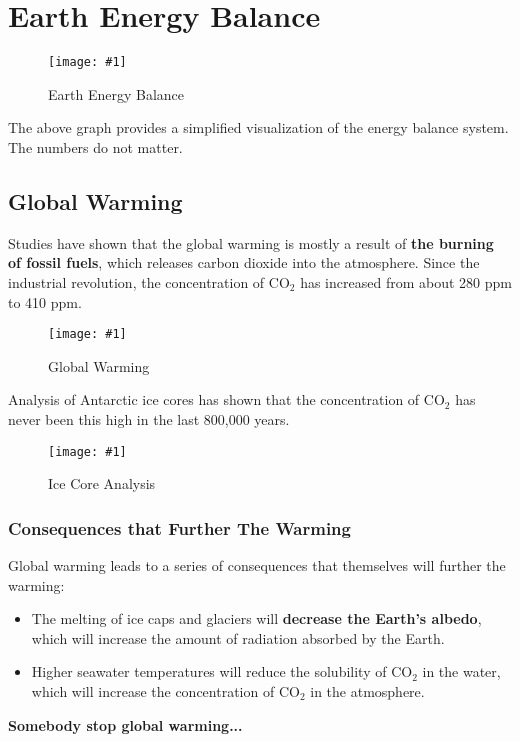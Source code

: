 \documentclass[a4paper,12pt]{article}
\let\oldsection\section
\renewcommand\section{\clearpage\oldsection}
\newcommand{\img}[4]{\begin{center}
  \begin{figure}[H]
    \centering
    \texttt{[image: \#1]}
    \caption{#3}
    \label{fig:#4}
  \end{figure}
\end{center}}
\begin{document}
\section{Earth Energy Balance}

\img{systemsummary.png}{1}{Earth Energy Balance}{systemsummary}

The above graph provides a simplified visualization of the energy balance system. The numbers do not matter.

\pagebreak

\subsection{Global Warming}

Studies have shown that the global warming is mostly a result of \textbf{the burning of fossil fuels}, which releases carbon dioxide into the atmosphere. Since the industrial revolution, the concentration of CO$_2$ has increased from about 280 ppm to 410 ppm.

\img{env.png}{0.8}{Global Warming}{env}

Analysis of Antarctic ice cores has shown that the concentration of CO$_2$ has never been this high in the last 800,000 years.

\img{icecore.png}{0.8}{Ice Core Analysis}{icecore}

\pagebreak

\subsubsection{Consequences that Further The Warming}

Global warming leads to a series of consequences that themselves will further the warming:
\begin{itemize}
  \item The melting of ice caps and glaciers will \textbf{decrease the Earth's albedo}, which will increase the amount of radiation absorbed by the Earth.
  \item Higher seawater temperatures will reduce the solubility of CO$_2$ in the water, which will increase the concentration of CO$_2$ in the atmosphere.
\end{itemize}

\pagebreak

\vspace*{10cm}

\begin{center}
  \textbf{\Huge{Somebody stop global warming...}}
\end{center}
\end{document}

